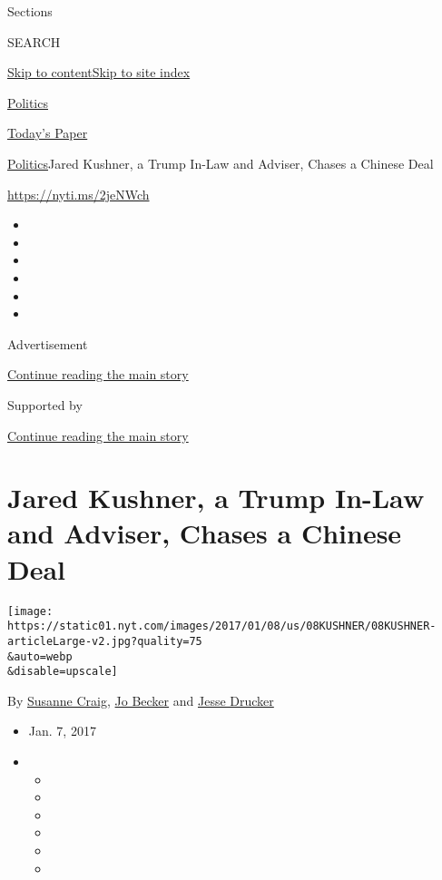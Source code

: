 Sections

SEARCH

\protect\hyperlink{site-content}{Skip to
content}\protect\hyperlink{site-index}{Skip to site index}

\href{https://www.nytimes.com/section/politics}{Politics}

\href{https://myaccount.nytimes.com/auth/login?response_type=cookie\&client_id=vi}{}

\href{https://www.nytimes.com/section/todayspaper}{Today's Paper}

\href{/section/politics}{Politics}\textbar{}Jared Kushner, a Trump
In-Law and Adviser, Chases a Chinese Deal

\url{https://nyti.ms/2jeNWch}

\begin{itemize}
\item
\item
\item
\item
\item
\item
\end{itemize}

Advertisement

\protect\hyperlink{after-top}{Continue reading the main story}

Supported by

\protect\hyperlink{after-sponsor}{Continue reading the main story}

\hypertarget{jared-kushner-a-trump-in-law-and-adviser-chases-a-chinese-deal}{%
\section{Jared Kushner, a Trump In-Law and Adviser, Chases a Chinese
Deal}\label{jared-kushner-a-trump-in-law-and-adviser-chases-a-chinese-deal}}

\texttt{[image: https://static01.nyt.com/images/2017/01/08/us/08KUSHNER/08KUSHNER-articleLarge-v2.jpg?quality=75\\\&auto=webp\\\&disable=upscale]}

By \href{http://www.nytimes.com/by/susanne-craig}{Susanne Craig},
\href{http://www.nytimes.com/by/jo-becker}{Jo Becker} and
\href{https://www.nytimes.com/by/jesse-drucker}{Jesse Drucker}

\begin{itemize}
\item
  Jan. 7, 2017
\item
  \begin{itemize}
  \item
  \item
  \item
  \item
  \item
  \item
  \end{itemize}
\end{itemize}

